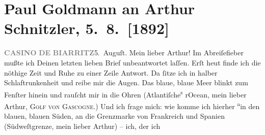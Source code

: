 

         
         \renewcommand{\erwaehntePersonen}{Personen: Richard Beer-Hofmann, Fedor Mamroth}
         \renewcommand{\erwaehnteInstitutionen}{Institutionen: Casino de Biarritz}
         \renewcommand{\erwaehnteOrte}{Orte: Atlantischer Ozean, Biarritz, Biskaya, Café Pfob, Cauterets, Faberhäuser, Frankreich, Pau, Pyrenees, Salzburg, San Sebastian, Spanien, Wien}
         \renewcommand{\erwaehnteWerke}{Werke: Aus der Kaffeehausecke, Gespräch, welches in der Kaffeehausecke nach Vorlesung der »Elixiere« geführt wird, Tagebuch}
               \section[Paul Goldmann an Arthur Schnitzler, 5. 8. {[}1892{]}]{ Paul Goldmann an Arthur Schnitzler, 5. 8. {[}1892{]}}\nopagebreak{}\rehead{ }\begin{ledgroupsized}[t]{13cm}\normalsize\beginnumbering \toendnotes[C]{\smallbreak\pagebreak[2]} 
\toendnotes[C]{\smallbreak}\pstart
           \noindent{}{\pb}\textcolor{gray}{\textbf{CASINO}}\pend
           \pstart
           \textcolor{gray}{\textbf{DE}}\pend
           \pstart
           \textcolor{gray}{\textbf{BIARRITZ}}\hfill 5. Auguſt. \pend
           \pstart\center{}Mein lieber Arthur!\pend\pstart
           Im Abreiſefieber mußte ich Deinen letzten lieben Brief unbeantwortet laſſen. Erſt
                  heut finde ich die nöthige Zeit und Ruhe zu einer
               Zeile Antwort. Da ſitze ich in halber Schlaftrunkenheit und reibe mir die Augen. Das
               blaue, blaue Meer blinkt zum Fenſter hinein und rauſcht mir in die Ohren (Atlantiſche\substVorne{}\textsuperscript{s }\substDazwischen{}r\substHinten{}{ }{\pb}Ocean, mein lieber Arthur, \textsc{Golf von Gascogne}.) Und ich frage mich: wie  komme ich hierher \substVorne{}\textsuperscript{a}\substDazwischen{}in\substHinten{} den blauen, blauen Süden,  an die
               Grenzmarke von Frankreich und Spanien (Südweſtgrenze, mein lieber Arthur) – ich, der ich \label{K_L02701-44v}
\end{ledgroupsized}
